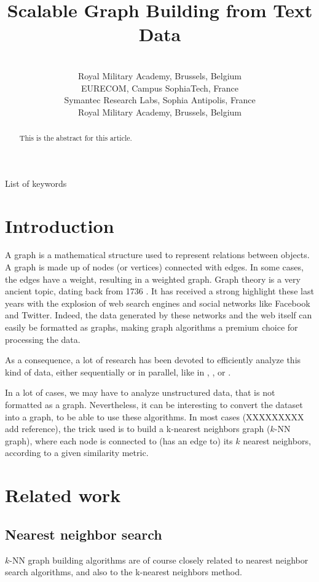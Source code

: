 \documentclass[wcp]{jmlr}
\title[Scalable Graph Building from Text Data]{Scalable Graph Building from Text Data}
\author{\Name{Thibault Debatty} \Email{thibault.debatty@rma.ac.be}\\
  \addr Royal Military Academy, Brussels, Belgium
  \AND
  \Name{Pietro Michiardi} \Email{pietro.michiardi@eurecom.fr}\\
  \addr EURECOM, Campus SophiaTech, France
  \AND
  \Name{Olivier Thonnard} \Email{olivier\_thonnard@symantec.com}\\
  \addr Symantec Research Labs, Sophia Antipolis, France
  \AND
  \Name{Wim Mees} \Email{wim.mees@rma.ac.be}\\
  \addr Royal Military Academy, Brussels, Belgium
 }
\begin{document}
\maketitle

\begin{abstract}
This is the abstract for this article.
\end{abstract}

\begin{keywords}
List of keywords
\end{keywords}

\section{Introduction}
A graph is a mathematical structure used to represent relations between objects. A graph is made up of nodes (or vertices) connected with edges. In some cases, the edges have a weight, resulting in a weighted graph. Graph theory is a very ancient topic, dating back from 1736 \cite{Biggs1986}. It has received a strong highlight these last years with the explosion of web search engines and social networks like Facebook and Twitter. Indeed, the data generated by these networks and the web itself can easily be formatted as graphs, making graph algorithms a premium choice for processing the data.

As a consequence, a lot of research has been devoted to efficiently analyze this kind of data, either sequentially or in parallel, like in \cite{Rajaraman2010b}, \cite{Liben2005}, \cite{Broder:2000:GSW:347319.346290} or \cite{Scott:2011:SHS:2392673}.

In a lot of cases, we may have to analyze unstructured data, that is not formatted as a graph. Nevertheless, it can be interesting to convert the dataset into a graph, to be able to use these algorithms. In most cases (XXXXXXXXX add reference), the trick used is to build a k-nearest neighbors graph ($k$-NN graph), where each node is connected to (has an edge to) its $k$ nearest neighbors, according to a given similarity metric.

\section{Related work}

\subsection{Nearest neighbor search}
$k$-NN graph building algorithms are of course closely related to nearest neighbor search algorithms, and also to the k-nearest neighbors method.
\end{document}
